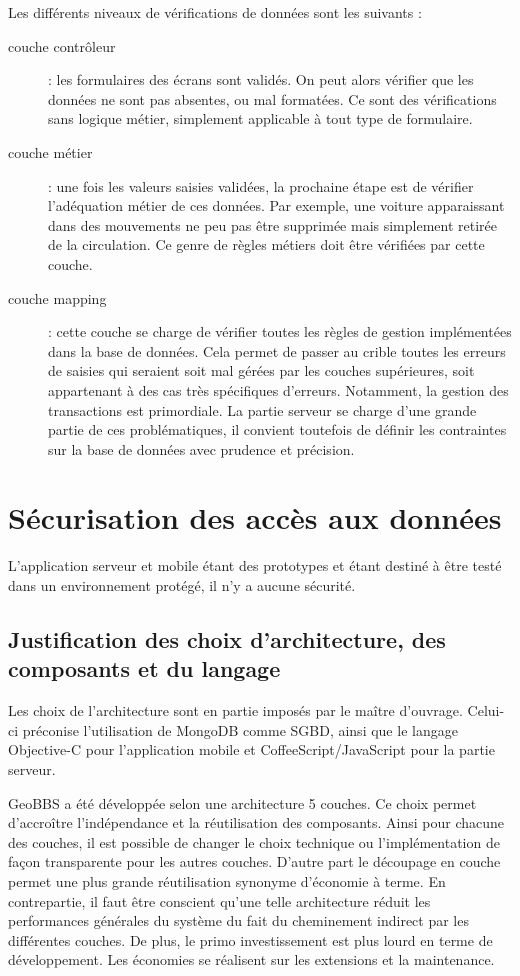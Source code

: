 \documentclass[a4paper,12pt]{report}
\begin{document}
\begin{onehalfspace}
Les différents niveaux de vérifications de données sont les suivants :
\begin{description}
\item[couche contrôleur] : les formulaires des écrans sont validés. On peut alors vérifier que les données ne sont pas absentes, ou mal formatées. Ce sont des vérifications sans logique métier, simplement applicable à tout type de formulaire.
\item[couche métier] : une fois les valeurs saisies validées, la prochaine étape est de vérifier l’adéquation métier de ces données. Par exemple, une voiture apparaissant dans des mouvements ne peu pas être supprimée mais simplement retirée de la circulation. Ce genre de règles métiers doit être vérifiées par cette couche.
\item[couche mapping] : cette couche se charge de vérifier toutes les règles de gestion implémentées dans la base de données. Cela permet de passer au crible toutes les erreurs de saisies qui seraient soit mal gérées par les couches supérieures, soit appartenant à des cas très spécifiques d’erreurs. Notamment, la gestion des transactions est primordiale. La partie serveur se charge d’une grande partie de ces problématiques, il convient toutefois de définir les contraintes sur la base de données avec prudence et précision.
\end{description}

\section{Sécurisation des accès aux données}
  L'application serveur et mobile étant des prototypes et étant destiné à être testé dans un environnement protégé, il n'y a aucune sécurité.

\subsection{Justification des choix d'architecture, des composants et du langage}

  Les choix de l'architecture sont en partie imposés  par le maître d'ouvrage. Celui-ci préconise l'utilisation de MongoDB comme SGBD, ainsi que le langage Objective-C pour l'application mobile et CoffeeScript/JavaScript pour la partie serveur.

  GeoBBS a été développée selon une architecture 5 couches. Ce choix permet d'accroître l'indépendance et la réutilisation des composants. Ainsi pour chacune des couches, il est possible de changer le choix technique ou l'implémentation de façon transparente pour les autres couches. D'autre part le découpage en couche permet une plus grande réutilisation synonyme d'économie à terme. En contrepartie, il faut être conscient qu'une telle architecture réduit les performances générales du système du fait du cheminement indirect par les différentes couches. De plus, le primo investissement est plus lourd en terme de développement. Les économies se réalisent sur les extensions et la maintenance.


\end{onehalfspace}
\end{document}
